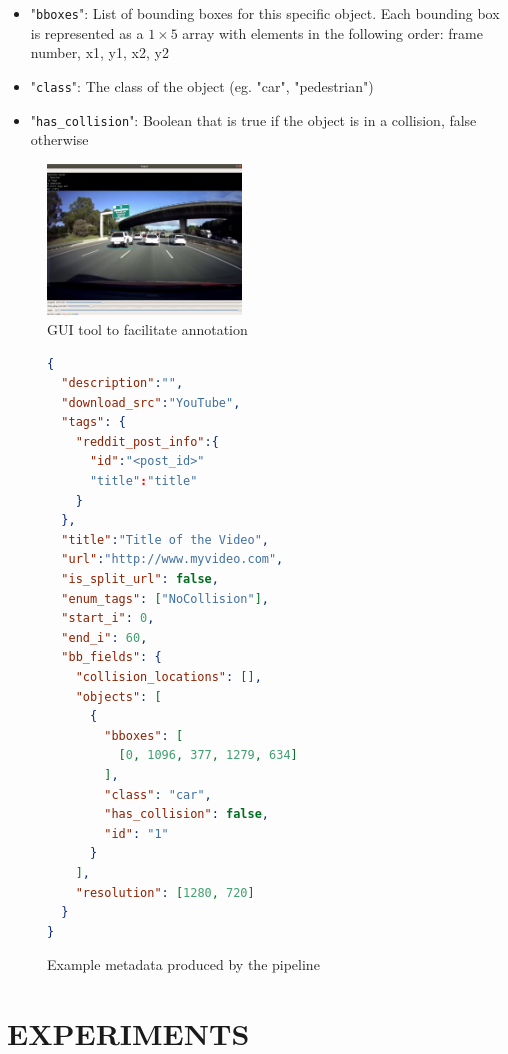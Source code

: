 \documentclass[letterpaper, 10 pt, conference]{ieeeconf}
\begin{document}
\begin{itemize}
\begin{itemize}
\begin{itemize}
      \item "\texttt{bboxes}": List of bounding boxes for this specific object. Each bounding box is represented as a $1\times5$ array with elements in the following order: frame number, x1, y1, x2, y2
      \item "\texttt{class}": The class of the object (eg. "car", "pedestrian")
      \item "\texttt{has\_collision}": Boolean that is true if the object is in a collision, false otherwise
    \end{itemize}
  \end{itemize}
\end{itemize}

\begin{figure}[htbp]
	\centering
	\includegraphics[width=0.46\textwidth]{example_gui_tool.png}
	\caption{GUI tool to facilitate annotation}
	\label{fig:example_gui_tool-png}
\end{figure}

\begin{figure}[htbp]
  \begin{lstlisting}[language=json,xleftmargin=5mm]
{
  "description":"",
  "download_src":"YouTube",
  "tags": {
    "reddit_post_info":{
      "id":"<post_id>"
      "title":"title"
    }
  },
  "title":"Title of the Video",
  "url":"http://www.myvideo.com",
  "is_split_url": false,
  "enum_tags": ["NoCollision"],
  "start_i": 0,
  "end_i": 60,
  "bb_fields": {
    "collision_locations": [],
    "objects": [
      {
        "bboxes": [
          [0, 1096, 377, 1279, 634]
        ],
        "class": "car",
        "has_collision": false,
        "id": "1"
      }
    ],
    "resolution": [1280, 720]
  }
}
  \end{lstlisting}
    \caption{Example metadata produced by the pipeline}
    \label{metadata_example}
\end{figure}

\section{EXPERIMENTS}
\end{document}
